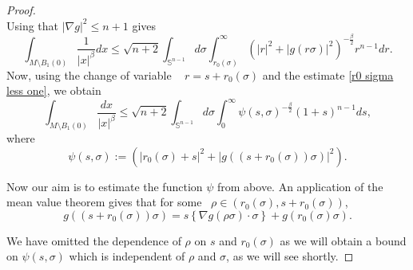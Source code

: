 \documentclass[reqno,12pt]{amsart}
\numberwithin{equation}{section}
\theoremstyle{plain}
\theoremstyle{definition}
\renewcommand{\leq}{\leqslant}
\begin{document}
\begin{proof}
\begin{equation*}
\end{equation*}
Using that $|\nabla g|^2\leq n+1$ gives 
\begin{equation*}
    \label{eq: integral representation 3}
    \int_{M\setminus B_1(0)} \frac{1}{|x|^\beta}dx \leq \sqrt{n+2}\int_{\mathbb{S}^{n-1}}d\sigma   \int_{r_0(\sigma)}^\infty  \left( |r|^2+ |g(r\sigma)|^2\right)^{-\frac{\beta}{2}}r^{n-1}dr.
\end{equation*}
Now, using the change of variable ~ $r = s +r_0(\sigma)$ and the estimate \eqref{r0 sigma less one},  we obtain
\begin{equation}
    \label{eq: final inequality to prove}
    \int_{M\setminus B_1(0)} \frac{dx}{|x|^\beta} \leq \sqrt{n+2}\int_{\mathbb{S}^{n-1}}d\sigma   \int_{0}^\infty  \psi(s,\sigma)^{-\frac{\beta}{2}} (1+s)^{n-1}ds,
\end{equation}
where 
$$
\psi(s,\sigma) := \left( |r_0(\sigma) +s|^2+ |g((s+r_0(\sigma))\sigma)|^2\right).
$$

Now our aim is to estimate the function $\psi$ from above. An application of the mean value theorem gives that for some ~$\rho \in (r_0(\sigma), s+r_0(\sigma))$,
$$
g((s+r_0(\sigma))\sigma) = s \left\{\nabla g(\rho\sigma)\cdot \sigma \right\}+g(r_0(\sigma)\sigma).
$$

We have omitted the dependence of $\rho$ on $s$ and $r_0(\sigma)$ as we will obtain a bound on $\psi(s,\sigma)$ which is independent of $\rho $ and $\sigma$, as we will see shortly.



\end{proof}
\end{document}
